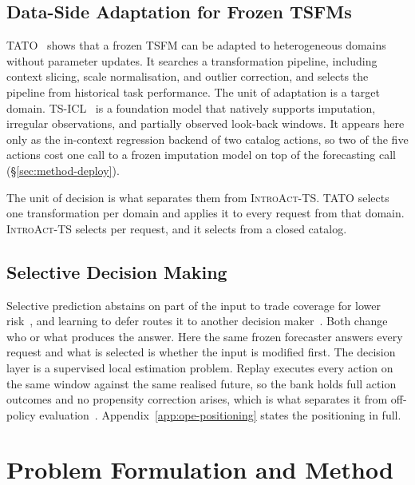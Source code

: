 \documentclass{article}
\newcommand{\introact}{\textsc{IntroAct-TS}}
\newcommand{\tsfm}{TSFM}
\begin{document}
\subsection{Data-Side Adaptation for Frozen \tsfm{}s}
\label{sec:related-dataside}
TATO~\citep{qiu2026tato} shows that a frozen \tsfm{} can be adapted to heterogeneous domains
without parameter updates. It searches a transformation pipeline, including context slicing,
scale normalisation, and outlier correction, and selects the pipeline from historical task
performance. The unit of adaptation is a target domain. TS-ICL~\citep{tsicl2026} is a
foundation model that natively supports imputation, irregular observations, and partially
observed look-back windows. It appears here only as the in-context regression backend of two
catalog actions, so two of the five actions cost one call to a frozen imputation model on top
of the forecasting call (\S\ref{sec:method-deploy}).

The unit of decision is what separates them from \introact{}. TATO selects one transformation
per domain and applies it to every request from that domain. \introact{} selects per request,
and it selects from a closed catalog.

\subsection{Selective Decision Making}
\label{sec:related-selective}
Selective prediction abstains on part of the input to trade coverage for lower
risk~\citep{chow1970optimum,vovk2005algorithmic,geifman2017selective,lei2018distribution}, and
learning to defer routes it to another decision maker~\citep{madras2018predict,
mozannar2020consistent}. Both change who or what produces the answer. Here the same frozen
forecaster answers every request and what is selected is whether the input is modified first.
The decision layer is a supervised local estimation problem. Replay executes every action on
the same window against the same realised future, so the bank holds full action outcomes and no
propensity correction arises, which is what separates it from off-policy
evaluation~\citep{dudik2011doubly,swaminathan2015counterfactual}. Appendix~\ref{app:ope-positioning} states the positioning in
full.

\section{Problem Formulation and Method}
\label{sec:method}
\end{document}
